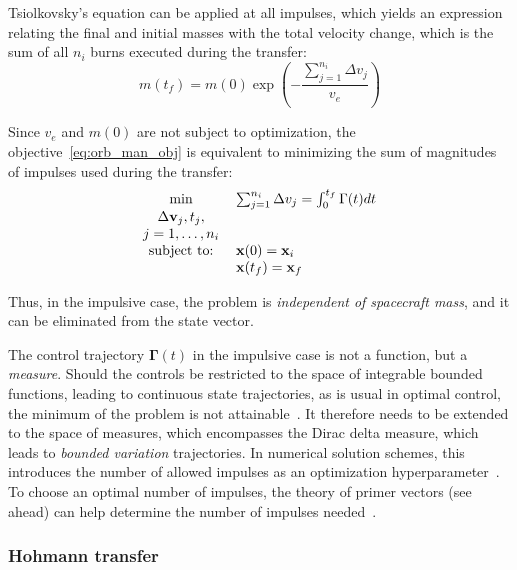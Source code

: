 Tsiolkovsky's equation can be applied at all impulses, which yields an expression relating the final and initial masses with the total velocity change, which is the sum of all \(n_i\) burns executed during the transfer:
\begin{equation}
    m(t_f) = m(0) \exp{\left(-\frac{\sum_{j=1}^{n_i}\Delta v_j}{v_e}\right)}
\end{equation}

Since \(v_e\) and \(m(0)\) are not subject to optimization, the objective~\eqref{eq:orb_man_obj} is equivalent to minimizing the sum of magnitudes of impulses used during the transfer:
\begin{align}\label{eq:imp_man_obj}
    \begin{tabular}{cl}
     $\min$ & $\sum_{j=1}^{n_i} \Delta v_j = \int_0^{t_f} \Gamma(t) dt$\\
         $\Delta \vel_j, t_j,$ &  \\
         \(j = 1, \dots, n_i\) & \\
          subject to: &$\x(0) = \x_i$\\
                      & $\x(t_f) = \x_f$
    \end{tabular}
 \end{align}

Thus, in the impulsive case, the problem is \textit{independent of spacecraft mass}, and it can be eliminated from the state vector. 

The control trajectory \(\mathbf{\Gamma}(t)\) in the impulsive case is not a function, but a \textit{measure}. Should the controls be restricted to the space of integrable bounded functions, leading to continuous state trajectories, as is usual in optimal control, the minimum of the problem is not attainable~\cite{impulsive_control}. It therefore needs to be extended to the space of measures, which encompasses the Dirac delta measure, which leads to \textit{bounded variation} trajectories. In numerical solution schemes, this introduces the number of allowed impulses as an optimization hyperparameter~\cite{optimal_impulsive_control}. To choose an optimal number of impulses, the theory of primer vectors (see ahead) can help determine the number of impulses needed~\cite{interactive_primer_vector}.

\subsubsection{Hohmann transfer}\label{sssec:hohmann}

